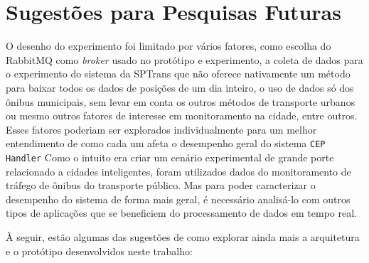 








\section{Sugestões para Pesquisas Futuras} 

O desenho do experimento foi limitado por vários fatores, como escolha do RabbitMQ como \textit{broker} usado no protótipo e experimento, a coleta de dados para o experimento do sistema da SPTrans que não oferece nativamente um método para baixar todos os dados de posições de um dia inteiro, o uso de dados só dos ônibus municipais, sem levar em conta os outros métodos de transporte urbanos ou mesmo outros fatores de interesse em monitoramento na cidade, entre outros. Esses fatores poderiam ser explorados individualmente para um melhor entendimento de como cada um afeta o desempenho geral do sistema  \texttt{CEP Handler}%
Como o intuito era criar um cenário experimental de grande porte relacionado a cidades inteligentes, foram utilizados dados do monitoramento de tráfego de ônibus do transporte público. Mas para poder caracterizar o desempenho do sistema de forma mais geral, é necessário analisá-lo com outros tipos de aplicações que se beneficiem do processamento de dados em tempo real. 

À seguir, estão algumas das sugestões de como explorar ainda mais a arquitetura e o protótipo desenvolvidos neste trabalho:

